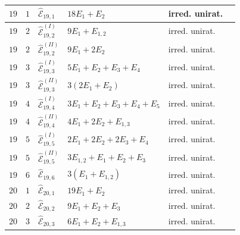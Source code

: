 \documentclass[11pt]{amsart}
\theoremstyle{definition}
\def\E{{\mathcal E}}
\begin{document}
\begin{minipage}[t]{\textwidth/2-1mm}
\begin{flushright}
{\begin{tabular}{ |l | l |l|l|l|l|}
$19$ & $1$ & $\widehat{\E}_{19,1}$ & $18E_1+E_2$ & irred. unirat. \\\hline
$19$ & $2$ & $\widehat{\E}_{19,2}^{(I)}$ & $9E_1+E_{1,2}$ & irred. unirat. \\
$19$ & $2$ & $\widehat{\E}_{19,2}^{(II)}$ & $9E_1+2E_2$ & irred. unirat. \\\hline
$19$ & $3$ & $\widehat{\E}_{19,3}^{(I)}$ & $5E_1+E_2+E_3+E_4$ & irred. unirat.\\
$19$ & $3$ & $\widehat{\E}_{19,3}^{(II)}$ & $3(2E_1+E_2)$  & irred. unirat.\\\hline 
$19$ & $4$ & $\widehat{\E}_{19,4}^{(I)}$ & $3E_1+E_2+E_3+E_4+E_5$ & irred. unirat.\\
$19$ & $4$ & $\widehat{\E}_{19,4}^{(II)}$ & $4E_1+2E_2+E_{1,3}$  & irred. unirat.\\\hline 
$19$ & $5$ & $\widehat{\E}_{19,5}^{(I)}$ & $2E_1+2E_2+2E_3+E_4$ & irred. unirat.\\
$19$ & $5$ & $\widehat{\E}_{19,5}^{(II)}$ & $3E_{1,2}+E_1+E_2+E_3$  & irred. unirat.\\\hline 
$19$ & $6$ & $\widehat{\E}_{19,6}$ & $3(E_1+E_{1,2})$ & irred. unirat. \\\hline\hline

$20$ & $1$ & $\widehat{\E}_{20,1}$ & $19E_1+E_2$ & irred. unirat. \\\hline
$20$ & $2$ & $\widehat{\E}_{20,2}$ & $9E_1+E_2+E_3$ & irred. unirat. \\\hline
$20$ & $3$ & $\widehat{\E}_{20,3}$ & $6E_1+E_2+E_{1,3}$ & irred. unirat. \\\hline

\end{tabular}    
}
\end{flushright}
\end{minipage}
\end{document}
